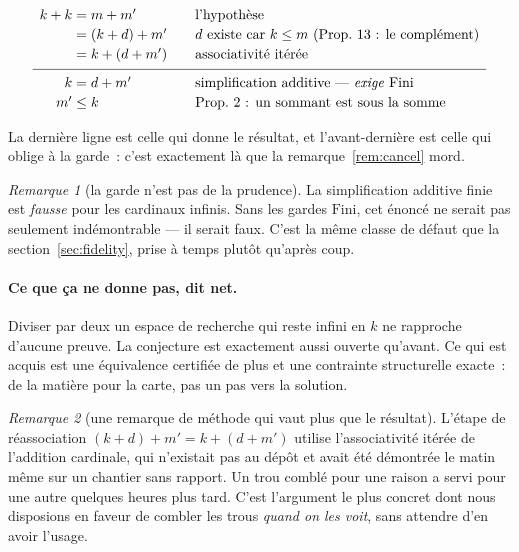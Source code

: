 \documentclass[11pt]{article}
\theoremstyle{remark}\newtheorem{remarque}{Remarque}
\begin{document}
\[
\begin{array}{r@{\;}c@{\;}l@{\qquad}l}
  k + k &=& m + m'      & \text{l'hypothèse} \\[2pt]
        &=& (k + d) + m'& d \text{ existe car } k \le m \text{ (Prop.\ 13 : le complément)} \\[2pt]
        &=& k + (d + m')& \text{associativité itérée} \\[4pt]
\hline \\[-8pt]
      k &=& d + m'      & \text{simplification additive --- \emph{exige} } \mathrm{Fini} \\[2pt]
     m' &\le& k         & \text{Prop.\ 2 : un sommant est sous la somme}
\end{array}
\]

\noindent
La dernière ligne est celle qui donne le résultat, et l'avant-dernière est celle qui
oblige à la garde~: c'est exactement là que la remarque~\ref{rem:cancel} mord.

\begin{remarque}[la garde n'est pas de la prudence]
La simplification additive finie est \emph{fausse} pour les cardinaux infinis. Sans les
gardes $\mathrm{Fini}$, cet énoncé ne serait pas seulement indémontrable --- il serait
faux. C'est la même classe de défaut que la section~\ref{sec:fidelity}, prise à temps
plutôt qu'après coup.
\end{remarque}

\paragraph{Ce que ça ne donne pas, dit net.} Diviser par deux un espace de recherche qui
reste infini en $k$ ne rapproche d'aucune preuve. La conjecture est exactement aussi
ouverte qu'avant. Ce qui est acquis est une équivalence certifiée de plus et une
contrainte structurelle exacte~: de la matière pour la carte, pas un pas vers la
solution.

\begin{remarque}[une remarque de méthode qui vaut plus que le résultat]
L'étape de réassociation $(k+d)+m' = k+(d+m')$ utilise l'associativité itérée de
l'addition cardinale, qui n'existait pas au dépôt et avait été démontrée le matin même
sur un chantier sans rapport. Un trou comblé pour une raison a servi pour une autre
quelques heures plus tard. C'est l'argument le plus concret dont nous disposions en
faveur de combler les trous \emph{quand on les voit}, sans attendre d'en avoir l'usage.
\end{remarque}
\end{document}
